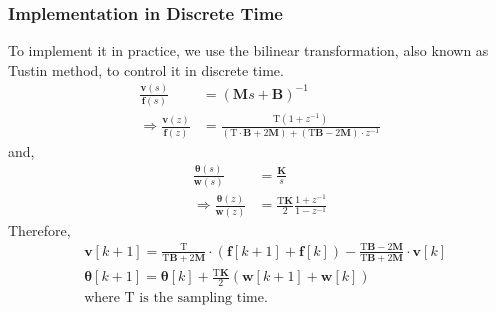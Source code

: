 \subsubsection{Implementation in Discrete Time}
\quad
To implement it in practice, we use the bilinear transformation, also known as Tustin method, to control it in discrete time.
\begin{equation}
\label{eq:z_domain eq}
\begin{split}
\frac{\boldsymbol{v}(s)}{\boldsymbol{f}(s)}
				&= \left( \mathbf{M}s+\mathbf{B}\right)^{-1}			\\
\Rightarrow 
\frac{\boldsymbol{v}(z)}{\boldsymbol{f}(z)}
				&= \frac{\mathrm{T}(1+z^{-1})}{(\mathrm{T}\cdot\mathbf{B}+2\mathbf{M})+(\mathrm{T}\mathbf{B}-2\mathbf{M})\cdot z^{-1}}
\end{split}
\end{equation}
\quad and,
\begin{equation}
\begin{split}
\frac{\boldsymbol{\theta}(s)}{\boldsymbol{w}(s)}
				&= \frac{\mathbf{K}}{s}				\\
\Rightarrow 
\frac{\boldsymbol{\theta}(z)}{\boldsymbol{w}(z)}
				&= \frac{\mathrm{T}\mathbf{K}}{2}	
					\frac{1+z^{-1}}{1-z^{-1}}
\end{split}
\end{equation}
Therefore,
\begin{equation}
\begin{split}
&\boldsymbol{v}[k+1] = \frac{\mathrm{T}}{\mathrm{T}\mathbf{B}+2\mathbf{M}}
							\cdot \left(	\boldsymbol{f}[k+1] + \boldsymbol{f}[k]		\right)
						 - \frac{\mathrm{T}\mathbf{B}-2\mathbf{M}}{\mathrm{T}\mathbf{B}+2\mathbf{M}}
						 	\cdot \boldsymbol{v}[k]												\\
&\boldsymbol{\theta}[k+1] = \boldsymbol{\theta}[k] + \frac{\mathrm{T}\mathbf{K}}{2}
												\left( \boldsymbol{w}[k+1] + \boldsymbol{w}[k] \right)
\\
&\text{where } \mathrm{T} \text{ is the sampling time.												}
\end{split}
\end{equation}
